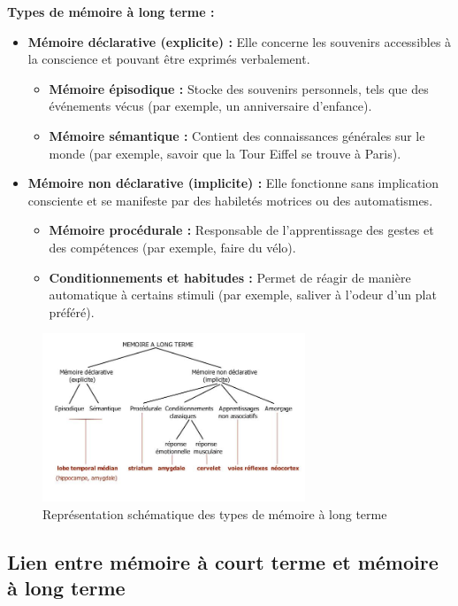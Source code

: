 \documentclass[12pt,a4paper]{report}
\begin{document}
\textbf{Types de mémoire à long terme :}
\begin{itemize}
    \item \textbf{Mémoire déclarative (explicite) :} Elle concerne les souvenirs accessibles à la conscience et pouvant être exprimés verbalement.
    \begin{itemize}
        \item \textbf{Mémoire épisodique :} Stocke des souvenirs personnels, tels que des événements vécus (par exemple, un anniversaire d'enfance).
        \item \textbf{Mémoire sémantique :} Contient des connaissances générales sur le monde (par exemple, savoir que la Tour Eiffel se trouve à Paris).
    \end{itemize}
    \item \textbf{Mémoire non déclarative (implicite) :} Elle fonctionne sans implication consciente et se manifeste par des habiletés motrices ou des automatismes.
    \begin{itemize}
        \item \textbf{Mémoire procédurale :} Responsable de l'apprentissage des gestes et des compétences (par exemple, faire du vélo).
        \item \textbf{Conditionnements et habitudes :} Permet de réagir de manière automatique à certains stimuli (par exemple, saliver à l'odeur d'un plat préféré).
    \end{itemize}
\end{itemize}

\begin{figure}[h]
    \centering
    \includegraphics[width=0.7\textwidth]{images/types_memoire_long_terme.jpg}
    \caption{Représentation schématique des types de mémoire à long terme}
    \label{fig:mlt}
\end{figure}

\newpage
\subsection{Lien entre mémoire à court terme et mémoire à long terme}
\end{document}
